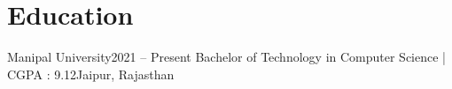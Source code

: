 \section{Education}
  \resumeSubHeadingListStart
    \resumeSubheading
      {Manipal University}{2021 -- Present}
      {Bachelor of Technology in Computer Science | CGPA : 9.12}{Jaipur, Rajasthan }
  \resumeSubHeadingListEnd
  \vspace{-10pt}

